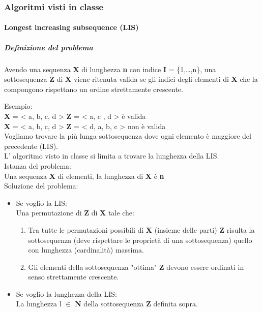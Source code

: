 \documentclass[11pt]{article}
\begin{document}
\subsubsection{Algoritmi visti in classe}
\label{sec:org53577fd}

\paragraph{Longest increasing subsequence (LIS)}
\label{sec:orgdd80f07}

\subparagraph{Definizione del problema}
\label{sec:org49673c8}

Avendo una sequenza \textbf{X} di lunghezza \textbf{n} con indice \textbf{I} = \{1,\ldots{},n\}, \newline
una sottosequenza \textbf{Z} di \textbf{X} viene ritenuta valida se gli indici degli elementi
di \textbf{X} che la compongono rispettano un ordine strettamente crescente.

Esempio: \\
\textbf{X} = < a, b, c, d >  \textbf{Z} = < a, c , d > è valida \\
\textbf{X} = < a, b, c, d >  \textbf{Z} = < d, a, b, c > non è valida \\

Vogliamo trovare la più lunga sottosequenza dove ogni elemento è maggiore del precedente (LIS).\\
L' algoritmo visto in classe si limita a trovare la lunghezza della LIS. \\

Istanza del problema: \\
Una sequenza \textbf{X} di elementi, la lunghezza di \textbf{X} è \textbf{n} \\

Soluzione del problema: \\
\begin{itemize}
\item Se voglio la LIS: \\
Una permutazione di \textbf{Z} di \textbf{X} tale che:
\begin{enumerate}
\item Tra tutte le permutazioni possibili di \textbf{X} (insieme delle parti) \textbf{Z} risulta la sottosequenza (deve rispettare le proprietà di una sottosequenza) quello con lunghezza (cardinalità) massima.
\item Gli elementi della sottosequenza "ottima" \textbf{Z} devono essere ordinati in senso strettamente crescente.
\end{enumerate}

\item Se voglio la lunghezza della LIS: \\
La lunghezza l \(\in\) \textbf{N} della sottosequenza \textbf{Z} definita sopra.
\end{itemize}
\end{document}
